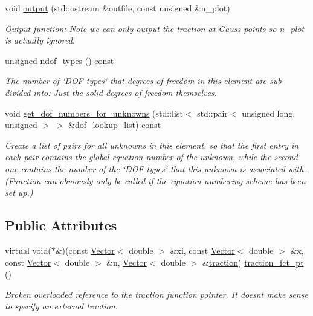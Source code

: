 \begin{DoxyCompactItemize}
void \hyperlink{classoomph_1_1FSISolidTractionElement_a8f4008e86ceefec5f6678cdf37e49eb8}{output} (std\+::ostream \&outfile, const unsigned \&n\+\_\+plot)
\begin{DoxyCompactList}\small\item\em Output function\+: Note we can only output the traction at \hyperlink{classoomph_1_1Gauss}{Gauss} points so n\+\_\+plot is actually ignored. \end{DoxyCompactList}\item 
unsigned \hyperlink{classoomph_1_1FSISolidTractionElement_a1b45927afbb43a1808b5857128995ae4}{ndof\+\_\+types} () const
\begin{DoxyCompactList}\small\item\em The number of \char`\"{}\+D\+O\+F types\char`\"{} that degrees of freedom in this element are sub-\/divided into\+: Just the solid degrees of freedom themselves. \end{DoxyCompactList}\item 
void \hyperlink{classoomph_1_1FSISolidTractionElement_a9adce8a7e39bba43c3a231f970d82785}{get\+\_\+dof\+\_\+numbers\+\_\+for\+\_\+unknowns} (std\+::list$<$ std\+::pair$<$ unsigned long, unsigned $>$ $>$ \&dof\+\_\+lookup\+\_\+list) const
\begin{DoxyCompactList}\small\item\em Create a list of pairs for all unknowns in this element, so that the first entry in each pair contains the global equation number of the unknown, while the second one contains the number of the \char`\"{}\+D\+O\+F types\char`\"{} that this unknown is associated with. (Function can obviously only be called if the equation numbering scheme has been set up.) \end{DoxyCompactList}\end{DoxyCompactItemize}
\subsection*{Public Attributes}
\begin{DoxyCompactItemize}
\item 
virtual void($\ast$\&)(const \hyperlink{classoomph_1_1Vector}{Vector}$<$ double $>$ \&xi, const \hyperlink{classoomph_1_1Vector}{Vector}$<$ double $>$ \&x, const \hyperlink{classoomph_1_1Vector}{Vector}$<$ double $>$ \&n, \hyperlink{classoomph_1_1Vector}{Vector}$<$ double $>$ \&\hyperlink{classoomph_1_1SolidTractionElement_ab00a3429962eb33612054e82095f8082}{traction}) \hyperlink{classoomph_1_1FSISolidTractionElement_a4d1acd383b92177b86bce888e48a67e8}{traction\+\_\+fct\+\_\+pt} ()
\begin{DoxyCompactList}\small\item\em Broken overloaded reference to the traction function pointer. It doesn\textquotesingle{}t make sense to specify an external traction. \end{DoxyCompactList}\end{DoxyCompactItemize}
